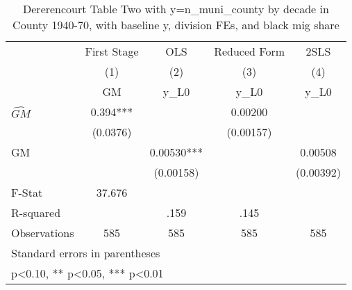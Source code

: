 \begin{table}[htbp]\centering
\def\sym#1{\ifmmode^{#1}\else\(^{#1}\)\fi}
\caption{Dererencourt Table Two with y=n\_muni\_county by decade in County 1940-70, with baseline y, division FEs, and black mig share}
\begin{tabular}{l*{4}{c}}
\toprule
                    & First Stage   &         OLS   &Reduced Form   &        2SLS   \\
                    &\multicolumn{1}{c}{(1)}&\multicolumn{1}{c}{(2)}&\multicolumn{1}{c}{(3)}&\multicolumn{1}{c}{(4)}\\
                    &\multicolumn{1}{c}{GM}&\multicolumn{1}{c}{y\_L0}&\multicolumn{1}{c}{y\_L0}&\multicolumn{1}{c}{y\_L0}\\
\midrule
$\hat{GM}$          &       0.394***&               &     0.00200   &               \\
                    &    (0.0376)   &               &   (0.00157)   &               \\
\addlinespace
GM                  &               &     0.00530***&               &     0.00508   \\
                    &               &   (0.00158)   &               &   (0.00392)   \\
\midrule
F-Stat              &      37.676   &               &               &               \\
R-squared           &               &        .159   &        .145   &               \\
Observations        &         585   &         585   &         585   &         585   \\
\bottomrule
\multicolumn{5}{l}{\footnotesize Standard errors in parentheses}\\
\multicolumn{5}{l}{\footnotesize * p<0.10, ** p<0.05, *** p<0.01}\\
\end{tabular}
\end{table}
